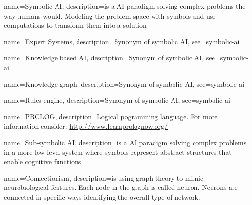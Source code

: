 







{
  name={Symbolic AI},
  description={is a AI paradigm solving complex problems the way humans would. Modeling the problem space with symbols and use computations to transform them into a solution}
}

{
  name={Expert Systems},
  description={Synonym of symbolic AI},
  see={symbolic-ai}
}

{
  name={Knowledge based AI},
  description={Synonym of symbolic AI},
  see={symbolic-ai}
}

{
  name={Knowledge graph},
  description={Synonym of symbolic AI},
  see={symbolic-ai}
}

{
  name={Rules engine},
  description={Synonym of symbolic AI},
  see={symbolic-ai}
}

{
  name={PROLOG},
  description={Logical pogramming language. For more information consider: \url{http://www.learnprolognow.org/}}
}

{
  name={Sub-symbolic AI},
  description={is a AI paradigm solving complex problems in a more low level system where symbols represent abstract structures that enable cognitive functions}
}

{
  name={Connectionism},
  description={is using graph theory to mimic neurobiological features. Each node in the graph is called neuron. Neurons are connected in specific ways identifying the overall type of network.}
}